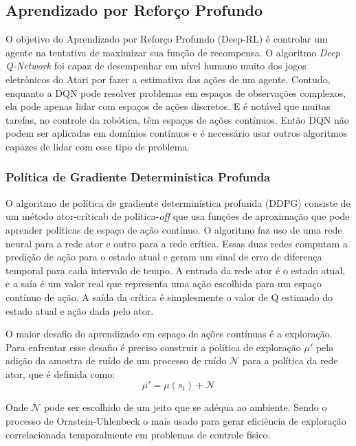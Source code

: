 \subsection{Aprendizado por Reforço Profundo}

O objetivo do Aprendizado por Reforço Profundo (Deep-RL) é controlar um agente na tentativa de maximizar sua função de recompensa.
O algoritmo \textit{Deep Q-Network} \cite{mnih2013playing} foi capaz de desempenhar em nível humano muito dos jogos eletrônicos do Atari por fazer a estimativa das ações de um agente.
Contudo, enquanto a DQN pode resolver problemas em espaços de observações complexos, ela pode apenas lidar com espaços de ações discretos.
E é notável que muitas tarefas, no controle da robótica, têm espaços de ações contínuos.
Então DQN não podem ser aplicadas em domínios contínuos e é necessário usar outros algoritmos capazes de lidar com esse tipo de problema.

\subsubsection{Política de Gradiente Determinística Profunda}

O algoritmo de política de gradiente determinística profunda (DDPG) consiste de um método ator-críticab de política-\textit{off} que usa funções de aproximação que pode aprender políticas de espaço de ação contínuo.
O algoritmo faz uso de uma rede neural para a rede ator e outro para a rede crítica.
Essas duas redes computam a predição de ação para o estado atual e geram um sinal de erro de diferença temporal para cada intervalo de tempo.
A entrada da rede ator é o estado atual, e a saía é um valor real que representa uma ação escolhida para um espaço contínuo de ação.
A saída da crítica é simplesmente o valor de Q estimado do estado atual e ação dada pelo ator.

O maior desafio do aprendizado em espaço de ações contínuas é a exploração. 
Para enfrentar esse desafio é preciso construir a política de exploração $\mu'$ pela adição da amostra de ruído de um processo de ruído $\mathcal{N}$ para a política da rede ator, que é definida como:
\begin{equation}
    \mu' = \mu(s_t) + \mathcal{N}
\end{equation}

Onde $\mathcal{N}$ pode ser escolhido de um jeito que se adéqua ao ambiente. Sendo o processo de Ornstein-Uhlenbeck \cite{uhlenbeck1930theory} o mais usado para gerar eficiência de exploração correlacionada temporalmente em problemas de controle físico.

